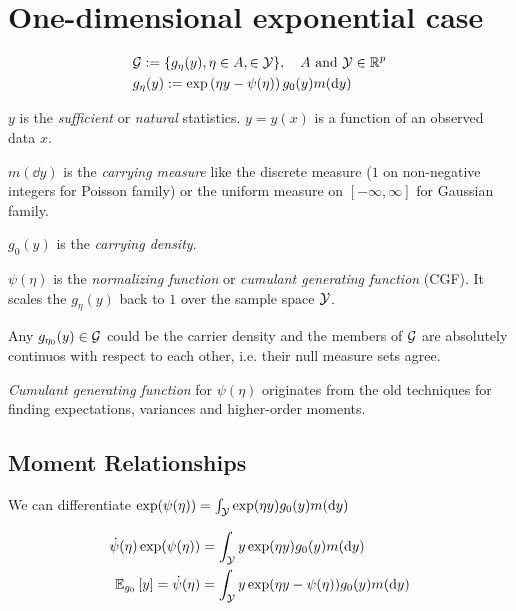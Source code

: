 
\section{One-dimensional exponential case}

\begin{align*}
    &\Gc := \{g_{\eta}(y), \eta \in A,  \in \Yc \}, \quad A \text{ and } \Yc \in \Rf^p \\
    &g_{\eta}(y) := \exp\left(\eta y - \psi(\eta)\right) g_0(y) m(\dd{y})
\end{align*}

$y$ is the \textit{sufficient} or \textit{natural} statistics. 
$y = y(x)$ is a function of an observed data $x$.

$m(\dd{y})$ is the \textit{carrying measure} like the discrete measure 
($1$ on non-negative integers for Poisson family) or the uniform measure on $[-\infty,\infty]$
for Gaussian family.

$g_0(y)$ is the \textit{carrying density}.

$\psi(\eta)$ is the \textit{normalizing function} or \textit{cumulant generating function} (CGF).
It scales the $g_{\eta}(y)$ back to $1$ over the sample space $\mathcal{Y}$.

\begin{remark}
    Any $g_{\eta_0}(y) \in \mathcal{G}$ could be the carrier density and the members of $\mathcal{G}$
    are absolutely continuos with respect to each other, 
    i.e. their null measure sets agree.
\end{remark}

\begin{remark}
    \textit{Cumulant generating function} for $\psi(\eta)$ originates from
    the old techniques for finding expectations, variances and higher-order moments.
\end{remark}

\subsection{Moment Relationships}

We can differentiate $\exp(\psi(\eta)) = \int_{\mathcal{Y}} \exp(\eta y) g_0(y)m(\dd{y})$

\begin{align}
    \dot{\psi}(\eta) \exp(\psi(\eta)) &= \int_{\Yc} y\exp(\eta y) g_0(y) m(\dd{y}) \\
    \ERWi{g_0}{y} = \dot{\psi}(\eta) &= \int_{\Yc} y\exp(\eta y - \psi(\eta)) g_0(y) m(\dd{y}) 
\end{align}

